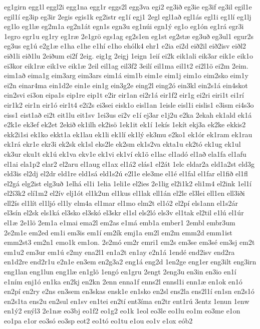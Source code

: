 {eg1girn
egg1l
eggl2i
egg1na
egg1r
eggs2l
egg3va
egi2
eg3ið
eg3ie
eg3if
eg3il
egil1e
egil1í
eg3ip
eg3ir
2egis
egis1k
eg2istr
eg1í
egj1
2egl
egl1að
egl1ás
egl1i
eg1lí
eg1lj
eg1lo
eg1læ
eg2m1a
eg2n1át
egn1s
egn3u
eg1núi
egn1ý
eg1o
eg1ón
eg1rá
egr3i
1egro
egr1u
eg1ry
eg1ræ
2e1grö
egs1ag
eg2s1en
eg1st
eg2stæ
eg3uð
eg3ul1
egur2s
eg3us
eg1ú
e2g1æ
e1ha
e1he
e1hí
e1ho
ehólk4
ehr1
e2ia
ei2d
eið2il
eið2isv
eiðl2
eið1li
eið1lu
2eiðum
ei2f
2eig.
eig1g
2eigj
1eign
1eií
ei2k
eik1ali
eik3ar
eik1e
eik1o
ei3kor
eik1ræ
eik1ve
eik1æ
2eil
eil1ag
eil3f2
3eilí
eil1ma
eil1t2
ei2l1ö
ei2m
2eim.
eim1að
eima1g
eim3arg
eim3ars
eim1á
eim1b
eim1e
eim1j
eim1o
eim2sko
eim1y
ei2n
einar4ma
ein1d2e
ein1e
ein1g
ein3g2e
eing2l
eing2ó
ein3kl
ein2s1á
ein4skot
ein2svi
ei3on
eipa1s
eip1re
eip1t
e2ir
eir1an
ei2r1á
eir1f2
eir1g
ei2ri
eiri1t
ei1rí
eir1k2
eir1n
eir1ó
eir1t4
e2i2s
ei3sei
eisk1o
eisl1an
1eisle
eisl1i
eislis1
e3ism
ei4s3o
eiss1
eist1að
ei2t
eit1lu
eit1sv
1ei3us
ei2v
e1í
ej3ar
e1j2u
e2ka
2ekah
ek1ald
ek1á
e2k1e
ek3ef
ek2et
2ekið
ek1ilh
ek2isö
1ek1it
ek1í
1ekís
1ekít
ekj3a
ek2ke
ekkis2
ekk2i1si
ek1ko
ekkt1a
ek1lau
ek1li
ek1lí
ek1lý
ek3mu
e2ko1
ek1ór
ek1ram
ek1rau
ek1rá
ekr1e
ekr3i
ek2sk
ek1sl
eks2le
ek2sm
ek1s2va
ekta1u
ek2tó
ek1ug
ek1ul
ek3ur
eku1t
ek1ú
ek1va
ekv1e
ek1vi
ek1ví
ek1ö
e1lac
el1adó
el1að
ela1fa
el1afu
el1ai
ela1p2
elar2
el2aru
el1aug
el1ax
el1á2
elás1
el2át
1elc
eldar2a
eld1a2st
eld3g
eld3is
el2dj
el2dr
eld1re
eld1sá
eld1s2ú
e2l1e
ele3me
el1é
el1fal
el1far
el1fið
el1fl
el2gá
elg2ist
elg3uð
1elhá
el1i
1elia
1eli1e
el2ies
2e1lig
el2i1k2
eli1m4
el2ink
1el1í
el2í3k2
elí1m2
el2ív
elj1ót
el1k2un
el1kus
el1lak
ell1án
el2le
el3lei
ell1en
ell3iði
ell2ís
el1lít
el1ljó
el1ly
elm4a
el1mar
el1mo
elm2t
el1ó2
el2pí
els1ann
el1s2ár
el3sín
el2sk
els1ká
el3sko
el3skó
el3skr
el1sl
els2ló
els3v
el1tak
el2til
e1lú
el1úr
el1æ
2e1lö
2em1a
e1mai
ema2l
em2as
e1má
emb1a
ember1
2embl
embr3um
2e2m1e
em2ed
em1i
em3is
em1í
em2ík
emj1a
em2l
em2m
emm2d
emm1ist
emm2st3
em2n1
emo1k
em1on.
2e2mó
em2r
emri1
em2s
em3se
em3sé
em3sj
em2t
em1u2
em3ur
em1ú
e2my
ena2l1
en1a2t
en1ay
e2n1á
1endé
end2isv
end2ra
en1d2re
end2r1u
e2n1e
en3em
en2g3a2
eng1á
eng2d
1en2ge
eng1er
eng3ilt
eng3irn
eng1lan
eng1lun
eng1læ
en1glö
1engó
en1gru
2engt
2eng3u
en3in
en3io
en1í
e1ním
enj1ó
en1ka
en2kj
en2kn
2enn
enna1f
enns2l
ennsl1i
enn1æ
en1ok
en1ó
en2pí
en2ry
e2ns
en3sem
en3skas
ensk1e
en1sko
en2sl
ens2la
ens2l1í
en1sn
en2s1ó
en2s1ta
ens2u
en2sul
en1sv
en1tei
en2tí
ent3íma
en2tr
ent1rú
3entz
1enun
1enw
en1ý2
enýl3
2e1næ
eo3bj
eo1f2
eo1g2
eo1k
1eol
eo3le
eo1lu
eo1m
eo3me
e1on
eo1pa
e1or
eo3só
eo3sp
eot2
eo1tó
eo1tu
e1ou
eo1v
e1ox
eób2
}
